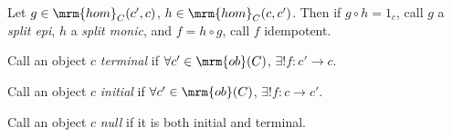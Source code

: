 \documentclass{fkbook}
\newcommand{\ob}{\mrm{ob}}
\newcommand{\homm}{\mrm{hom}}
\begin{document}
Let $g \in \homm_C(c',c)$, $h \in \homm_C(c,c')$. Then if $g\circ h =
1_c$, call $g$ a \emph{split epi}, $h$ a \emph{split monic}, and $f =
h\circ g$, call $f$ idempotent.

\begin{definition}[Terminal]
  Call an object $c$ \emph{terminal} if $\forall c' \in \ob(C)$,
  $\exists ! f : c' \to c$. \\
\end{definition}

\begin{definition}[Initial]
  Call an object $c$ \emph{initial} if $\forall c' \in \ob(C)$,
  $\exists ! f : c \to c'$. \\
\end{definition}

\begin{definition}[Null]
  Call an object $c$ \emph{null} if it is both initial and terminal.
\end{definition}
\end{document}
